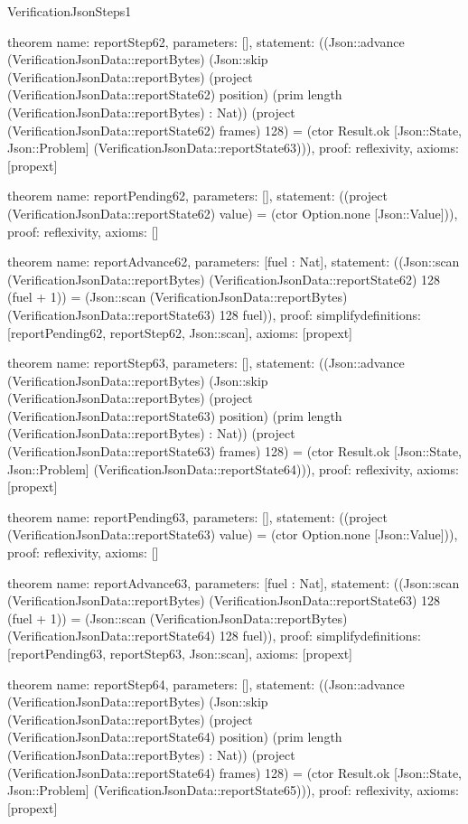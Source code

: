 \begin{lexlean}{VerificationJsonSteps1}
\begin{semanticmodule}
theorem{
  name: reportStep62,
  parameters: [],
  statement: ((Json::advance (VerificationJsonData::reportBytes) (Json::skip (VerificationJsonData::reportBytes) (project (VerificationJsonData::reportState62) position) (prim length (VerificationJsonData::reportBytes) : Nat)) (project (VerificationJsonData::reportState62) frames) 128) = (ctor Result.ok [Json::State, Json::Problem] (VerificationJsonData::reportState63))),
  proof: reflexivity{},
  axioms: [propext]
}

theorem{
  name: reportPending62,
  parameters: [],
  statement: ((project (VerificationJsonData::reportState62) value) = (ctor Option.none [Json::Value])),
  proof: reflexivity{},
  axioms: []
}

theorem{
  name: reportAdvance62,
  parameters: [fuel : Nat],
  statement: ((Json::scan (VerificationJsonData::reportBytes) (VerificationJsonData::reportState62) 128 (fuel + 1)) = (Json::scan (VerificationJsonData::reportBytes) (VerificationJsonData::reportState63) 128 fuel)),
  proof: simplify{definitions: [reportPending62, reportStep62, Json::scan]},
  axioms: [propext]
}

theorem{
  name: reportStep63,
  parameters: [],
  statement: ((Json::advance (VerificationJsonData::reportBytes) (Json::skip (VerificationJsonData::reportBytes) (project (VerificationJsonData::reportState63) position) (prim length (VerificationJsonData::reportBytes) : Nat)) (project (VerificationJsonData::reportState63) frames) 128) = (ctor Result.ok [Json::State, Json::Problem] (VerificationJsonData::reportState64))),
  proof: reflexivity{},
  axioms: [propext]
}

theorem{
  name: reportPending63,
  parameters: [],
  statement: ((project (VerificationJsonData::reportState63) value) = (ctor Option.none [Json::Value])),
  proof: reflexivity{},
  axioms: []
}

theorem{
  name: reportAdvance63,
  parameters: [fuel : Nat],
  statement: ((Json::scan (VerificationJsonData::reportBytes) (VerificationJsonData::reportState63) 128 (fuel + 1)) = (Json::scan (VerificationJsonData::reportBytes) (VerificationJsonData::reportState64) 128 fuel)),
  proof: simplify{definitions: [reportPending63, reportStep63, Json::scan]},
  axioms: [propext]
}

theorem{
  name: reportStep64,
  parameters: [],
  statement: ((Json::advance (VerificationJsonData::reportBytes) (Json::skip (VerificationJsonData::reportBytes) (project (VerificationJsonData::reportState64) position) (prim length (VerificationJsonData::reportBytes) : Nat)) (project (VerificationJsonData::reportState64) frames) 128) = (ctor Result.ok [Json::State, Json::Problem] (VerificationJsonData::reportState65))),
  proof: reflexivity{},
  axioms: [propext]
}


\end{semanticmodule}
\end{lexlean}
